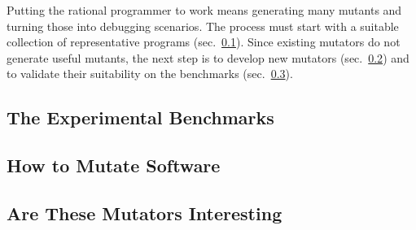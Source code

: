 
Putting the rational programmer to work means generating many mutants and turning
those into debugging scenarios. The process must start with a suitable
collection of representative programs (sec.~\ref{sub:mutate-benchmarks}).
Since existing mutators do not generate useful mutants, the next step is to
develop new mutators (sec.~\ref{sub:mutate-mutators}) and to validate their
suitability on the benchmarks (sec.~\ref{sub:mutate-interesting}).

\def\sub#1#2{\subsection{#2} \label{sub:mutate-#1} }

\sub{benchmarks}{The Experimental Benchmarks}

\sub{mutators}   {How to Mutate Software} 
\sub{interesting}{Are These Mutators Interesting} 
